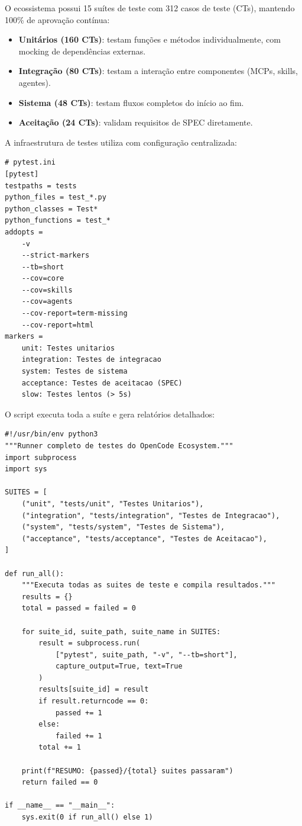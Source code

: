 O ecossistema possui 15 suítes de teste com 312 casos de teste (CTs),
mantendo 100\% de aprovação contínua:

\begin{itemize}
\item \textbf{Unitários (160 CTs)}: testam funções e métodos
individualmente, com mocking de dependências externas.
\item \textbf{Integração (80 CTs)}: testam a interação entre componentes
(MCPs, skills, agentes).
\item \textbf{Sistema (48 CTs)}: testam fluxos completos do início ao fim.
\item \textbf{Aceitação (24 CTs)}: validam requisitos de SPEC
diretamente.
\end{itemize}

A infraestrutura de testes utiliza  com configuração
centralizada:

\begin{lstlisting}[style=pythonstyle, caption={Configuracao pytest do ecossistema},
                   label={lst:pytest-config}]
# pytest.ini
[pytest]
testpaths = tests
python_files = test_*.py
python_classes = Test*
python_functions = test_*
addopts =
    -v
    --strict-markers
    --tb=short
    --cov=core
    --cov=skills
    --cov=agents
    --cov-report=term-missing
    --cov-report=html
markers =
    unit: Testes unitarios
    integration: Testes de integracao
    system: Testes de sistema
    acceptance: Testes de aceitacao (SPEC)
    slow: Testes lentos (> 5s)
\end{lstlisting}

O script  executa toda a suíte e gera relatórios
detalhados:

\begin{lstlisting}[style=pythonstyle, caption={Runner de testes},
                   label={lst:test-runner}]
#!/usr/bin/env python3
"""Runner completo de testes do OpenCode Ecosystem."""
import subprocess
import sys

SUITES = [
    ("unit", "tests/unit", "Testes Unitarios"),
    ("integration", "tests/integration", "Testes de Integracao"),
    ("system", "tests/system", "Testes de Sistema"),
    ("acceptance", "tests/acceptance", "Testes de Aceitacao"),
]

def run_all():
    """Executa todas as suites de teste e compila resultados."""
    results = {}
    total = passed = failed = 0

    for suite_id, suite_path, suite_name in SUITES:
        result = subprocess.run(
            ["pytest", suite_path, "-v", "--tb=short"],
            capture_output=True, text=True
        )
        results[suite_id] = result
        if result.returncode == 0:
            passed += 1
        else:
            failed += 1
        total += 1

    print(f"RESUMO: {passed}/{total} suites passaram")
    return failed == 0

if __name__ == "__main__":
    sys.exit(0 if run_all() else 1)
\end{lstlisting}

